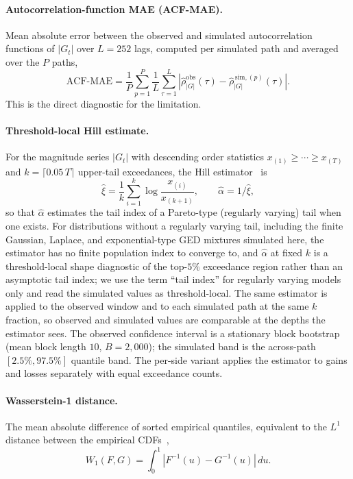 \paragraph{Autocorrelation-function MAE (ACF-MAE).}
Mean absolute error between the observed and simulated autocorrelation functions of $|G_t|$ over $L = 252$ lags, computed per simulated path and averaged over the $P$ paths,
\begin{equation}
    \text{ACF-MAE} = \frac{1}{P}\sum_{p=1}^{P}\frac{1}{L}\sum_{\tau=1}^{L} \left| \hat\rho^{\text{obs}}_{|G|}(\tau) - \hat\rho^{\,\text{sim},(p)}_{|G|}(\tau) \right|.
    \label{eq:acf_mae_supp}
\end{equation}
This is the direct diagnostic for the \citet{ryden1998stylized} limitation.

\paragraph{Threshold-local Hill estimate.}
For the magnitude series $|G_t|$ with descending order statistics $x_{(1)} \ge \cdots \ge x_{(T)}$ and $k = \lceil 0.05\,T \rceil$ upper-tail exceedances, the Hill estimator~\cite{hill1975tail} is
\begin{equation}
    \hat\xi = \frac{1}{k}\sum_{i=1}^{k} \log \frac{x_{(i)}}{x_{(k+1)}}, \qquad \hat\alpha = 1/\hat\xi,
    \label{eq:hill_supp}
\end{equation}
so that $\hat\alpha$ estimates the tail index of a Pareto-type (regularly varying) tail when one exists. For distributions without a regularly varying tail, including the finite Gaussian, Laplace, and exponential-type GED mixtures simulated here, the estimator has no finite population index to converge to, and $\hat\alpha$ at fixed $k$ is a threshold-local shape diagnostic of the top-$5\%$ exceedance region rather than an asymptotic tail index; we use the term ``tail index'' for regularly varying models only and read the simulated values as threshold-local. The same estimator is applied to the observed window and to each simulated path at the same $k$ fraction, so observed and simulated values are comparable at the depths the estimator sees. The observed confidence interval is a stationary block bootstrap (mean block length $10$, $B = 2{,}000$); the simulated band is the across-path $[2.5\%, 97.5\%]$ quantile band. The per-side variant applies the estimator to gains and losses separately with equal exceedance counts.

\paragraph{Wasserstein-1 distance.}
The mean absolute difference of sorted empirical quantiles, equivalent to the $L^1$ distance between the empirical CDFs~\cite{glasserman2003monte},
\begin{equation}
    W_1(F, G) = \int_0^1 |F^{-1}(u) - G^{-1}(u)|\, du.
    \label{eq:wasserstein}
\end{equation}

